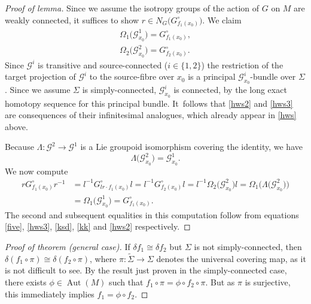 \documentclass[pdftex]{sigma}%
\numberwithin{equation}{section}
\DeclareMathOperator{\automorphism}{Aut}
\begin{document}
\begin{proof}[Proof of lemma] Since we assume the isotropy groups of
the action of $G$ on $M$ are weakly connected, it suffices to show $r
\in N_G\big(G_{f_1(x_0)}^\circ\big)$. We claim
 \begin{gather}
 \Omega_1\big({\mathcal G}^1_{x_0}\big)=G_{f_1(x_0)}^\circ ,\label{hws2}
 \\
\Omega_2\big({\mathcal G}^2_{x_0}\big)=G_{f_2(x_0)}^\circ.\label{hws3}
 \end{gather}
 Since ${\mathcal G}^i$ is transitive and
source-connected ($i \in \{1,2\}$) the restriction of the target
projection of ${\mathcal G}^i$ to the source-fibre over $x_0$ is a
principal ${\mathcal G}^i_{x_0}$-bundle over $\Sigma $. Since we
assume $\Sigma $ is simply-connected, ${\mathcal G}^i_{x_0}$ is
connected, by the long exact homotopy sequence for this principal
bundle. It~follows that \eqref{hws2} and \eqref{hws3} are consequences
of their infinitesimal analogues, which already appear in \eqref{hws}
above.

 Because $\Lambda \colon {\mathcal G}^2 \rightarrow {\mathcal G}^1$
is a Lie groupoid isomorphism covering the identity, we have
 \begin{equation}
 \Lambda \big({\mathcal G}^2_{x_0}\big) ={\mathcal G}^1_{x_0}.\label{kk}
 \end{equation}
 We now compute
 \begin{align*}
 r G_{f_1(x_0)}^\circ r^{-1} &= l^{-1}G_{lr \cdot
f_1(x_0)}^\circ l = l^{-1}G_{f_2(x_0)}^\circ l=l^{-1} \Omega_2
\big({\mathcal G}^2_{x_0}\big)l = \Omega_1
\big(\Lambda\big({\mathcal G}^2_{x_0}\big)\big)
\\
&=\Omega_1 \big({\mathcal
G}^1_{x_0}\big)=G_{f_1(x_0)}^\circ.
 \end{align*}
 The second and subsequent equalities in this
computation follow from equations \eqref{five}, \eqref{hws3},
\eqref{ksd}, \eqref{kk} and \eqref{hws2} respectively.
\end{proof}

\begin{proof}[Proof of theorem {\normalfont(general case)}]\sloppy If $\delta f_1 \cong
\delta f_2$ but $\Sigma $ is not simply-connected, then \mbox{$\delta(f_1
\circ \pi)\cong \delta(f_2 \circ \pi)$}, where $\pi \colon \tilde
\Sigma \rightarrow \Sigma $ denotes the universal covering map, as it
is not difficult to see. By the result just proven in the
simply-connected case, there exists $\phi \in \automorphism(M)$ such
that $f_1 \circ \pi = \phi \circ f_2 \circ \pi $. But as $\pi $ is
surjective, this immediately implies $f_1 = \phi \circ f_2 $.
\end{proof}
\end{document}
